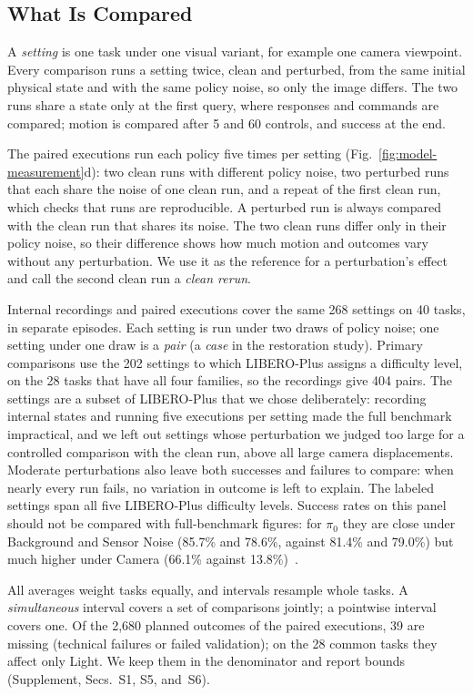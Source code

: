 \subsection{What Is Compared}
\label{sec:comparisons}
A \emph{setting} is one task under one visual variant, for example one camera viewpoint. Every comparison runs a setting twice, clean and perturbed, from the same initial physical state and with the same policy noise, so only the image differs. The two runs share a state only at the first query, where responses and commands are compared; motion is compared after 5 and 60 controls, and success at the end.

The paired executions run each policy five times per setting (Fig.~\ref{fig:model-measurement}d): two clean runs with different policy noise, two perturbed runs that each share the noise of one clean run, and a repeat of the first clean run, which checks that runs are reproducible. A perturbed run is always compared with the clean run that shares its noise. The two clean runs differ only in their policy noise, so their difference shows how much motion and outcomes vary without any perturbation. We use it as the reference for a perturbation's effect and call the second clean run a \emph{clean rerun}.

Internal recordings and paired executions cover the same 268 settings on 40 tasks, in separate episodes. Each setting is run under two draws of policy noise; one setting under one draw is a \emph{pair} (a \emph{case} in the restoration study). Primary comparisons use the 202 settings to which LIBERO-Plus assigns a difficulty level, on the 28 tasks that have all four families, so the recordings give 404 pairs. The settings are a subset of LIBERO-Plus that we chose deliberately: recording internal states and running five executions per setting made the full benchmark impractical, and we left out settings whose perturbation we judged too large for a controlled comparison with the clean run, above all large camera displacements. Moderate perturbations also leave both successes and failures to compare: when nearly every run fails, no variation in outcome is left to explain. The labeled settings span all five LIBERO-Plus difficulty levels. Success rates on this panel should not be compared with full-benchmark figures: for $\pi_0$ they are close under Background and Sensor Noise (85.7\% and 78.6\%, against 81.4\% and 79.0\%) but much higher under Camera (66.1\% against 13.8\%)~\cite{fei2026liberoplus}.


All averages weight tasks equally, and intervals resample whole tasks. A \emph{simultaneous} interval covers a set of comparisons jointly; a pointwise interval covers one. Of the 2,680 planned outcomes of the paired executions, 39 are missing (technical failures or failed validation); on the 28 common tasks they affect only Light. We keep them in the denominator and report bounds (Supplement, Secs.~S1, S5, and~S6).
